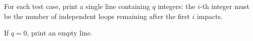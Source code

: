 For each test case, print a single line containing $q$ integers: the $i$-th integer must be the number of independent loops remaining after the first $i$ impacts.

If $q = 0$, print an empty line.

